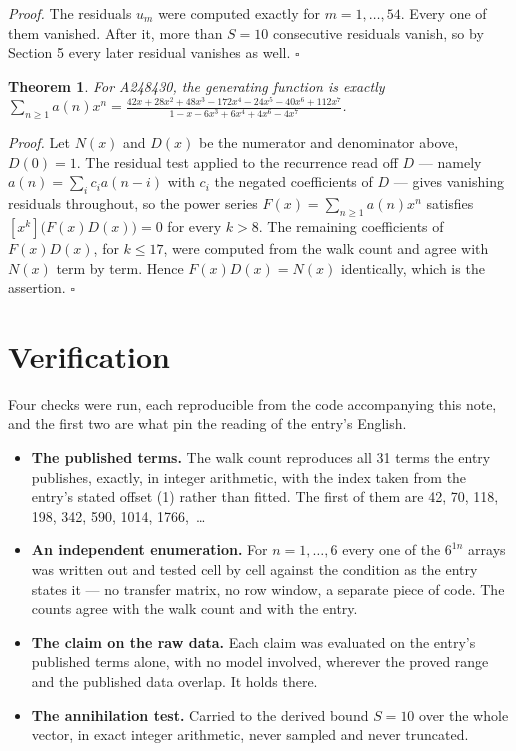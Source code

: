 \documentclass[11pt]{article}
\newtheorem{theorem}{Theorem}
\theoremstyle{definition}
\begin{document}
{\itshape Proof.} The residuals $u_m$ were computed exactly for $m = 1,\dots,54$. Every one of them vanished. After it, more than $S = 10$ consecutive residuals vanish, so by Section 5 every later residual vanishes as well. $\square$

\begin{theorem} For A248430, the generating function is exactly $\sum_{n\ge 1} a(n)x^n = \frac{42x + 28x^{2} + 48x^{3} - 172x^{4} - 24x^{5} - 40x^{6} + 112x^{7}}{1 - x - 6x^{3} + 6x^{4} + 4x^{6} - 4x^{7}}$.\end{theorem}

{\itshape Proof.} Let $N(x)$ and $D(x)$ be the numerator and denominator above, $D(0)=1$. The residual test applied to the recurrence read off $D$ --- namely $a(n) = \sum_i c_i a(n-i)$ with $c_i$ the negated coefficients of $D$ --- gives vanishing residuals throughout, so the power series $F(x)=\sum_{n\ge 1}a(n)x^n$ satisfies $[x^k]\bigl(F(x)D(x)\bigr) = 0$ for every $k > 8$. The remaining coefficients of $F(x)D(x)$, for $k \le 17$, were computed from the walk count and agree with $N(x)$ term by term. Hence $F(x)D(x) = N(x)$ identically, which is the assertion. $\square$

\section{Verification}

Four checks were run, each reproducible from the code accompanying this note, and the first two are what pin the reading of the entry's English.

\begin{itemize}

\item {\bfseries The published terms.} The walk count reproduces all 31 terms the entry publishes, exactly, in integer arithmetic, with the index taken from the entry's stated offset (1) rather than fitted. The first of them are 42, 70, 118, 198, 342, 590, 1014, 1766,~\dots

\item {\bfseries An independent enumeration.} For $n = 1,\dots,6$ every one of the $6^{1n}$ arrays was written out and tested cell by cell against the condition as the entry states it --- no transfer matrix, no row window, a separate piece of code. The counts agree with the walk count and with the entry.

\item {\bfseries The claim on the raw data.} Each claim was evaluated on the entry's published terms alone, with no model involved, wherever the proved range and the published data overlap. It holds there.

\item {\bfseries The annihilation test.} Carried to the derived bound $S = 10$ over the whole vector, in exact integer arithmetic, never sampled and never truncated.

\end{itemize}
\end{document}
